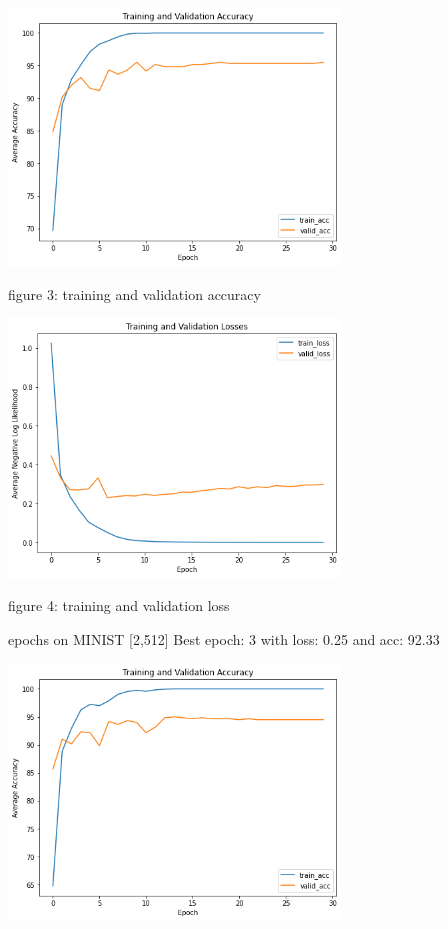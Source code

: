 \documentclass{homework}
\begin{document}
\centering
\includegraphics[width=250pt]{accuracyp3_128.png}

{figure 3: training and validation accuracy}

\centering
\includegraphics[width=250pt]{lossp3_128.png}

{figure 4: training and validation loss}

\raggedright

 epochs on MINIST [2,512] \newline
Best epoch: 3 with loss: 0.25 and acc: 92.33 \newline

\centering
\includegraphics[width=250pt]{accuracyp3_512.png}
\end{document}

